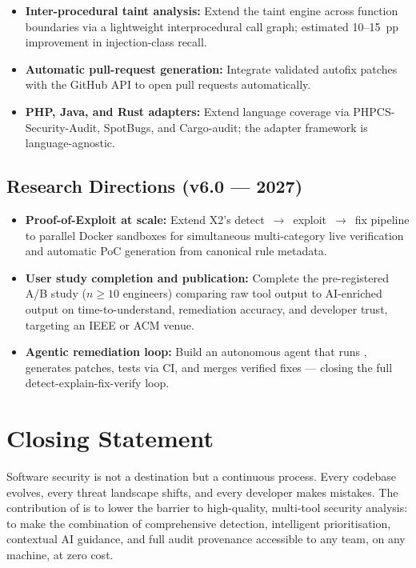 \begin{itemize}
  \item \textbf{Inter-procedural taint analysis:} Extend the taint engine across function boundaries via a lightweight interprocedural call graph; estimated 10--15~pp improvement in injection-class recall.

  \item \textbf{Automatic pull-request generation:} Integrate validated autofix patches with the GitHub API \cite{owasp_api_top10} to open pull requests automatically.

  \item \textbf{PHP, Java, and Rust adapters:} Extend language coverage via PHPCS-Security-Audit, SpotBugs, and Cargo-audit; the adapter framework is language-agnostic.
\end{itemize}

\subsection{Research Directions (v6.0 --- 2027)}

\begin{itemize}
  \item \textbf{Proof-of-Exploit at scale:} Extend X2's detect~$\to$~exploit~$\to$~fix pipeline to parallel Docker sandboxes for simultaneous multi-category live verification and automatic PoC generation from canonical rule metadata.

  \item \textbf{User study completion and publication:} Complete the pre-registered A/B study ($n \geq 10$ engineers) comparing raw tool output to \ACRQA{} AI-enriched output on time-to-understand, remediation accuracy, and developer trust, targeting an IEEE or ACM venue.

  \item \textbf{Agentic remediation loop:} Build an autonomous agent that runs \ACRQA{}, generates patches, tests via CI, and merges verified fixes --- closing the full detect-explain-fix-verify loop.
\end{itemize}

\section{Closing Statement}

Software security is not a destination but a continuous process. Every codebase evolves, every threat landscape shifts, and every developer makes mistakes. The contribution of \ACRQA{} is to lower the barrier to high-quality, multi-tool security analysis: to make the combination of comprehensive detection, intelligent prioritisation, contextual AI guidance, and full audit provenance accessible to any team, on any machine, at zero cost.

